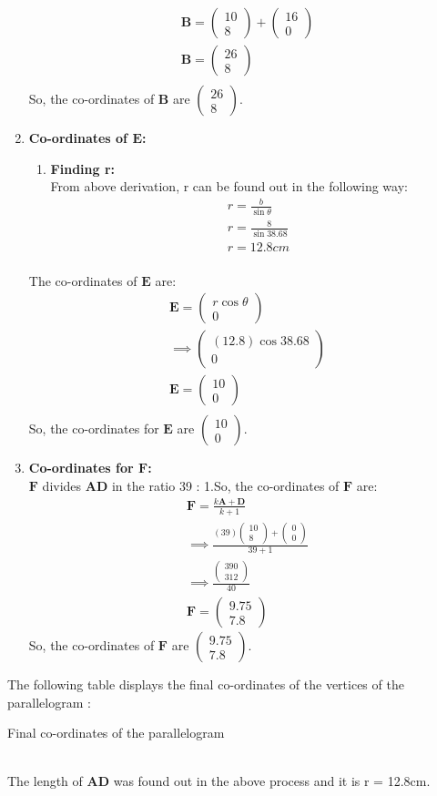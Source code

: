 \documentclass{article}
\newcommand{\myvec}[1]{\ensuremath{\begin{pmatrix}#1\end{pmatrix}}}
\let\vec\mathbf
\begin{document}
\begin{enumerate}
		\begin{align}
			\vec{B} = \myvec{10\\8} + \myvec{16\\0}\\
			\vec{B} = \myvec{26\\8}\\
		\end{align}
So, the co-ordinates of $\vec{B}$ are $\myvec{26\\8}$.
\item \textbf{Co-ordinates of $\vec{E}$:}\\
	\begin{enumerate}
		\item \textbf{Finding r:}\\
From above derivation, r can be found out in the following way:\\
			\begin{align}
				r = \frac{b}{\sin{\theta}}\\
				r = \frac{8}{\sin{38.68}}\\
				r = 12.8cm\\
			\end{align}
	\end{enumerate}
		The co-ordinates of $\vec{E}$ are:
		\begin{align}
			\vec{E} = \myvec{r\cos{\theta}\\0}\\
			\implies \myvec{(12.8)\cos{38.68}\\0}\\
			\vec{E} = \myvec{10\\0}\\
		\end{align}
So, the co-ordinates for $\vec{E}$ are $\myvec{10\\0}$.
\item \textbf{Co-ordinates for $\vec{F}$:}\\
	$\vec{F}$ divides $\vec{AD}$ in the ratio 39 : 1.So, the co-ordinates of $\vec{F}$ are:
		\begin{align}
			\vec{F} = \frac{k\vec{A} + \vec{D}}{k + 1}\\
			\implies \frac{(39)\myvec{10\\8} + \myvec{0\\0}}{39 + 1}\\
			\implies \frac{\myvec{390\\312}}{40}\\
			\vec{F} = \myvec{9.75\\7.8}
		\end{align}
So, the co-ordinates of $\vec{F}$ are $\myvec{9.75\\7.8}$.
\end{enumerate}
The following table displays the final co-ordinates of the vertices of the parallelogram :\\
\begin{table}[h]
	\centering
	
	\caption{Final co-ordinates of the parallelogram}
	\label{tab:table6}
\end{table}\\
The length of $\vec{AD}$ was found out in the above process and it is r = 12.8cm.
\end{document}
